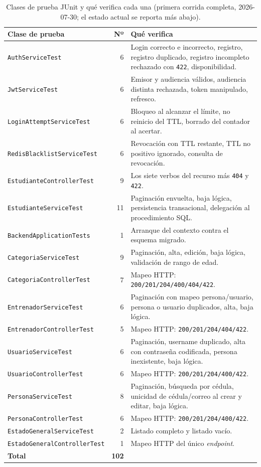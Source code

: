 \documentclass[11pt,a4paper]{article}
\begin{document}
\begin{table}[htbp]
\centering
\caption{Clases de prueba JUnit y qué verifica cada una (primera corrida completa, 2026-07-30; el estado actual se reporta más abajo).}
\label{tab:pruebas-junit}
\begin{tabular}{@{}lrp{7.4cm}@{}}
\toprule
\textbf{Clase de prueba} & \textbf{Nº} & \textbf{Qué verifica} \\
\midrule
\texttt{AuthServiceTest} & 6 & Login correcto e incorrecto, registro, registro duplicado, registro incompleto rechazado con \texttt{422}, disponibilidad. \\
\texttt{JwtServiceTest} & 6 & Emisor y audiencia válidos, audiencia distinta rechazada, token manipulado, refresco. \\
\texttt{LoginAttemptServiceTest} & 6 & Bloqueo al alcanzar el límite, no reinicio del TTL, borrado del contador al acertar. \\
\texttt{RedisBlacklistServiceTest} & 6 & Revocación con TTL restante, TTL no positivo ignorado, consulta de revocación. \\
\texttt{EstudianteControllerTest} & 9 & Los siete verbos del recurso más \texttt{404} y \texttt{422}. \\
\texttt{EstudianteServiceTest} & 11 & Paginación envuelta, baja lógica, persistencia transacional, delegación al procedimiento SQL. \\
\texttt{BackendApplicationTests} & 1 & Arranque del contexto contra el esquema migrado. \\
\texttt{CategoriaServiceTest} & 9 & Paginación, alta, edición, baja lógica, validación de rango de edad. \\
\texttt{CategoriaControllerTest} & 7 & Mapeo HTTP: \texttt{200/201/204/400/404/422}. \\
\texttt{EntrenadorServiceTest} & 6 & Paginación con mapeo persona/usuario, persona o usuario duplicados, alta, baja lógica. \\
\texttt{EntrenadorControllerTest} & 5 & Mapeo HTTP: \texttt{200/201/204/404/422}. \\
\texttt{UsuarioServiceTest} & 6 & Paginación, username duplicado, alta con contraseña codificada, persona inexistente, baja lógica. \\
\texttt{UsuarioControllerTest} & 6 & Mapeo HTTP: \texttt{200/201/204/400/422}. \\
\texttt{PersonaServiceTest} & 8 & Paginación, búsqueda por cédula, unicidad de cédula/correo al crear y editar, baja lógica. \\
\texttt{PersonaControllerTest} & 6 & Mapeo HTTP: \texttt{200/201/204/400/422}. \\
\texttt{EstadoGeneralServiceTest} & 2 & Listado completo y listado vacío. \\
\texttt{EstadoGeneralControllerTest} & 1 & Mapeo HTTP del único \emph{endpoint}. \\
\midrule
\textbf{Total} & \textbf{102} & \\
\bottomrule
\end{tabular}
\end{table}
\end{document}
